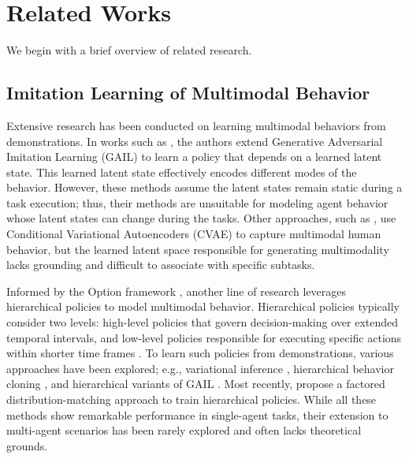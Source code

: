 \section{Related Works}
We begin with a brief overview of related research.

\subsection{Imitation Learning of Multimodal Behavior}
Extensive research has been conducted on learning multimodal behaviors from demonstrations. In works such as \cite{li2017infogail, hausman2017multi}, the authors extend Generative Adversarial Imitation Learning (GAIL) to learn a policy that depends on a learned latent state. This learned latent state effectively encodes different modes of the behavior. However, these methods assume the latent states remain static during a task execution; thus, their methods are unsuitable for modeling agent behavior whose latent states can change during the tasks. 
Other approaches, such as \cite{schmerling2018multimodal}, use Conditional Variational Autoencoders (CVAE) to capture multimodal human behavior, but the learned latent space responsible for generating multimodality lacks grounding and difficult to associate with specific subtasks. 

Informed by the Option framework \cite{sutton1999between}, another line of research leverages hierarchical policies to model multimodal behavior. Hierarchical policies typically consider two levels: high-level policies that govern decision-making over extended temporal intervals, and low-level policies responsible for executing specific actions within shorter time frames \cite{le2018hierarchical, jing2021adversarial}. 
To learn such policies from demonstrations, various approaches have been explored; e.g., variational inference \cite{unhelkar2019learning, orlov2022factorial}, hierarchical behavior cloning \cite{le2018hierarchical, kipf2019compile, zhang2021provable}, and hierarchical variants of GAIL \cite{sharma2018directed, lee2020learning, jing2021adversarial, chen2023multi}. Most recently, \cite{seo2024idil} propose a factored distribution-matching approach to train hierarchical policies. While all these methods show remarkable performance in single-agent tasks, their extension to multi-agent scenarios has been rarely explored and often lacks theoretical grounds.


